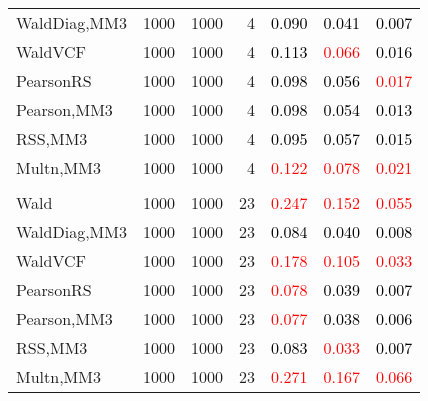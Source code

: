 \documentclass[
]{article}
\begin{document}
\begin{table}[H]
{\begin{tabular}[t]{lrrrrrr}
\hspace{1em}WaldDiag,MM3 & 1000 & 1000 & 4 & \textcolor{black}{0.090} & \textcolor{black}{0.041} & \textcolor{black}{0.007}\\
\hspace{1em}WaldVCF & 1000 & 1000 & 4 & \textcolor{black}{0.113} & \textcolor{red}{0.066} & \textcolor{black}{0.016}\\
\hspace{1em}PearsonRS & 1000 & 1000 & 4 & \textcolor{black}{0.098} & \textcolor{black}{0.056} & \textcolor{red}{0.017}\\
\hspace{1em}Pearson,MM3 & 1000 & 1000 & 4 & \textcolor{black}{0.098} & \textcolor{black}{0.054} & \textcolor{black}{0.013}\\
\hspace{1em}RSS,MM3 & 1000 & 1000 & 4 & \textcolor{black}{0.095} & \textcolor{black}{0.057} & \textcolor{black}{0.015}\\
\hspace{1em}Multn,MM3 & 1000 & 1000 & 4 & \textcolor{red}{0.122} & \textcolor{red}{0.078} & \textcolor{red}{0.021}\\
\addlinespace[0.3em]
\multicolumn{7}{l}{\textbf{1F 15V}}\\
\hspace{1em}Wald & 1000 & 1000 & 23 & \textcolor{red}{0.247} & \textcolor{red}{0.152} & \textcolor{red}{0.055}\\
\hspace{1em}WaldDiag,MM3 & 1000 & 1000 & 23 & \textcolor{black}{0.084} & \textcolor{black}{0.040} & \textcolor{black}{0.008}\\
\hspace{1em}WaldVCF & 1000 & 1000 & 23 & \textcolor{red}{0.178} & \textcolor{red}{0.105} & \textcolor{red}{0.033}\\
\hspace{1em}PearsonRS & 1000 & 1000 & 23 & \textcolor{red}{0.078} & \textcolor{black}{0.039} & \textcolor{black}{0.007}\\
\hspace{1em}Pearson,MM3 & 1000 & 1000 & 23 & \textcolor{red}{0.077} & \textcolor{black}{0.038} & \textcolor{black}{0.006}\\
\hspace{1em}RSS,MM3 & 1000 & 1000 & 23 & \textcolor{black}{0.083} & \textcolor{red}{0.033} & \textcolor{black}{0.007}\\
\hspace{1em}Multn,MM3 & 1000 & 1000 & 23 & \textcolor{red}{0.271} & \textcolor{red}{0.167} & \textcolor{red}{0.066}\\

\end{tabular}}
\end{table}
\end{document}
